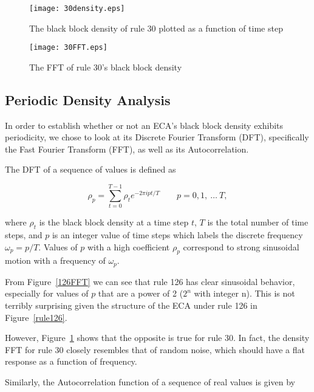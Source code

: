 \begin{figure}
    \begin{minipage}[b]{0.49\textwidth}
        \centering
        \texttt{[image: 30density.eps]}
        \caption{\label{30density} The black block density of rule 30 plotted as a function of time step}
    \end{minipage}
    \hspace{0.5cm}
    \begin{minipage}[b]{0.49\textwidth}
        \centering
        \texttt{[image: 30FFT.eps]}
        \caption{\label{30FFT} The FFT of rule 30's black block density}
    \end{minipage}
\end{figure}


\subsection{Periodic Density Analysis}
In order to establish whether or not an ECA's black block density
exhibits periodicity, we chose to look at its Discrete Fourier
Transform (DFT), specifically the Fast Fourier Transform (FFT), as
well as its Autocorrelation.

The DFT of a sequence of values is defined as

\begin{equation}
    \rho_p = \sum_{t=0}^{T-1} \rho_t e^{-2\pi i pt/T} \qquad p =
    0, 1,\ \ldots\ T,
\end{equation}

\noindent where $\rho_t$ is the black block density at a time step
$t$, $T$ is the total number of time steps, and $p$ is an integer
value of time steps which labels the discrete frequency
$\omega_p = p/T$.
Values of $p$ with a high coefficient $\rho_p$ correspond to strong
sinusoidal motion with a frequency of $\omega_p$.

From Figure~\ref{126FFT} we can see that rule 126 has clear sinusoidal
behavior, especially for values of $p$ that are a power of 2 ($2^n$
with integer n).
This is not terribly surprising given the structure of the ECA under
rule 126 in Figure~\ref{rule126}.

However, Figure~\ref{30FFT} shows that the opposite is true for rule
30.
In fact, the density FFT for rule 30 closely resembles that of random
noise, which should have a flat response as a function of frequency.

Similarly, the Autocorrelation function of a sequence of real values
is given by

